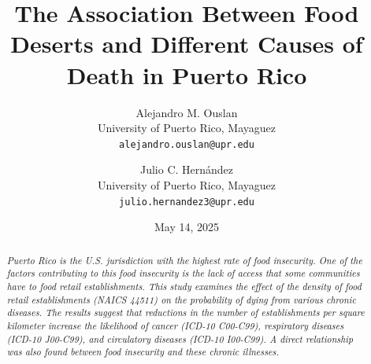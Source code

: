 \documentclass[12pt]{article}
\title{The Association Between Food Deserts and Different Causes of Death in Puerto Rico}
\author{
  Alejandro M. Ouslan \\
  \small{University of Puerto Rico, Mayaguez} \\
  \small{\texttt{alejandro.ouslan@upr.edu}}
  \and
  Julio C. Hernández \\
  \small{University of Puerto Rico, Mayaguez} \\
  \small{\texttt{julio.hernandez3@upr.edu}}
}
\date{May 14, 2025}
\begin{document}
\maketitle


\begin{abstract}
	\textit{
		Puerto Rico is the U.S. jurisdiction with the highest rate of food insecurity. One of the factors contributing
		to this food insecurity is the lack of access that some communities have to food retail establishments.
		This study examines the effect of the density of food retail establishments (NAICS 44511) on the probability
		of dying from various chronic diseases. The results suggest that reductions in the number of establishments
		per square kilometer increase the likelihood of cancer (ICD-10 C00-C99), respiratory diseases (ICD-10 J00-C99),
		and circulatory diseases (ICD-10 I00-C99). A direct relationship was also found between food insecurity and these
		chronic illnesses.
	}
\end{abstract}
\end{document}
